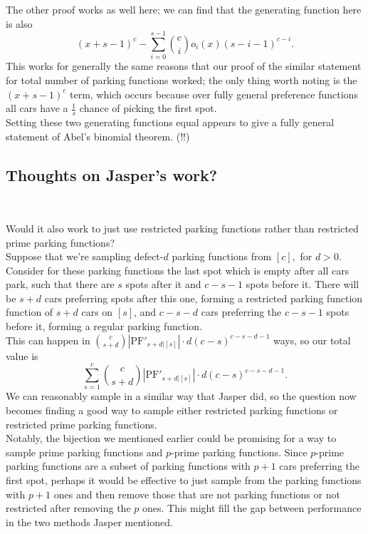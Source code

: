 The other proof works as well here; we can find that the generating function here is also $$(x+s-1)^c-\sum_{i=0}^{s-1} \binom{c}{i}o_i(x)(s-i-1)^{c-i}.$$ This works for generally the same reasons that our proof of the similar statement for total number of parking functions worked; the only thing worth noting is the $(x+s-1)^c$ term, which occurs because over fully general preference functions all cars have a $\frac{1}{s}$ chance of picking the first spot.\\

Setting these two generating functions equal appears to give a fully general statement of Abel's binomial theorem. (!!)

\subsection*{Thoughts on Jasper's work?}~

Would it also work to just use restricted parking functions rather than restricted prime parking functions?\\

Suppose that we're sampling defect-$d$ parking functions from $[c],$ for $d>0.$ Consider for these parking functions the last spot which is empty after all cars park, such that there are $s$ spots after it and $c-s-1$ spots before it. There will be $s+d$ cars preferring spots after this one, forming a restricted parking function function of $s+d$ cars on $[s]$, and $c-s-d$ cars preferring the $c-s-1$ spots before it, forming a regular parking function.\\

This can happen in $\binom{c}{s+d}|\mathrm{PF}'_{s+d|[s]}|\cdot d(c-s)^{c-s-d-1}$ ways, so our total value is $$\sum_{s=1}^{c}\binom{c}{s+d}|\mathrm{PF}'_{s+d|[s]}|\cdot d(c-s)^{c-s-d-1}.$$ We can reasonably sample in a similar way that Jasper did, so the question now becomes finding a good way to sample either restricted parking functions or restricted prime parking functions. \\

Notably, the bijection we mentioned earlier could be promising for a way to sample prime parking functions and $p$-prime parking functions. Since $p$-prime parking functions are a subset of parking functions with $p + 1$ cars preferring the first spot, perhaps it would be effective to just sample from the parking functions with $p + 1$ ones and then remove those that are not parking functions or not restricted after removing the $p$ ones. This might fill the gap between performance in the two methods Jasper mentioned.
